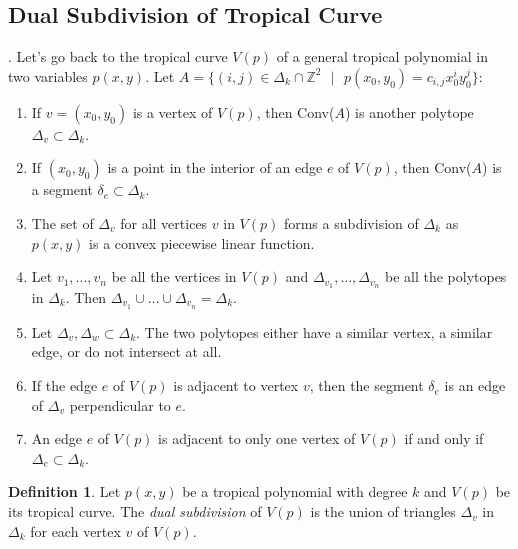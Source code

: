 \documentclass[]{article}
\theoremstyle{definition}
\numberwithin{equation}{section}
\newtheorem{defn}[thm]{Definition}
\renewcommand{\.}{\,.}
\begin{document}
\subsection{Dual Subdivision of Tropical Curve}. \label{doaal} Let's go back to the tropical curve $V(p)$ of a general tropical polynomial in two variables $p(x,y)$. Let $A=\{(i,j)\in \Delta_k \cap \mathbb{Z}^2\textrm{ }|\textrm{ }p(x_0,y_0)= c_{i,j}x_0^i y_0^j\} $:
\begin{enumerate}[noitemsep,topsep=-6pt]
	\item \vspace{0.75mm}
	If $v=(x_0,y_0)$ is a vertex of $V(p)$, then Conv($A$) is another polytope $\Delta_v\subset \Delta_k $.
	\vspace{2mm}
	\item If $(x_0,y_0)$ is a point in the interior of an edge $e$ of $V(p)$, then Conv($A$) is a segment $\delta_e \subset \Delta_k$. \vspace{-4.5mm}
	\item The set of $\Delta_v$ for all vertices $v$ in $V(p)$ forms a subdivision of $\Delta_k$ as $p(x,y)$ is a convex piecewise linear function.   \vspace{2mm}
	\item Let $v_1,\ldots,v_n$ be all the vertices in $V(p)$ and $\Delta_{v_1},\ldots, \Delta_{v_n}$ be all the polytopes in $\Delta_k$. Then $\Delta_{v_1}\cup\ldots\cup\Delta_{v_n}=\Delta_k$.
	\vspace{2mm}
	\item Let $\Delta_{v}, \Delta_{w}\subset \Delta_k$. The two polytopes either have a similar vertex, a similar edge, or do not intersect at all.
	\vspace{2mm}
	\item If the edge $e$ of $V(p)$ is adjacent to vertex $v$, then the segment $\delta_e$ is an edge of $\Delta_v$ perpendicular to $e$.
	\vspace{2mm}
	\item An edge $e$ of $V(p)$ is adjacent to only one vertex of $V(p)$ if and only if $\Delta_e\subset\Delta_k$.
	\vspace{3mm}
\end{enumerate} 
\begin{defn}
	Let $p(x,y)$ be a tropical polynomial with degree $k$ and $V(p)$ be its tropical curve. The \emph{dual subdivision} of $V(p)$ is the union of triangles $\Delta_v$ in $\Delta_k$ for each vertex $v$ of $V(p)$.
\end{defn}
\end{document}
